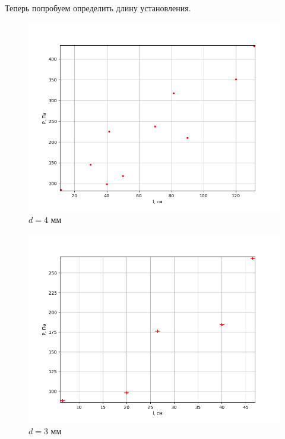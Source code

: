 \documentclass[12pt]{article}
\begin{document}
Теперь попробуем определить длину установления.
\begin{figure}[H]
	\centering
	\includegraphics[scale=0.55]{./images/d4mm2.png}
	\caption{$d = 4$ мм}
\end{figure}
\begin{figure}[H]
	\centering
	\includegraphics[scale=0.55]{./images/d3mm2.png}
	\caption{$d = 3$ мм}
\end{figure}
\end{document}
